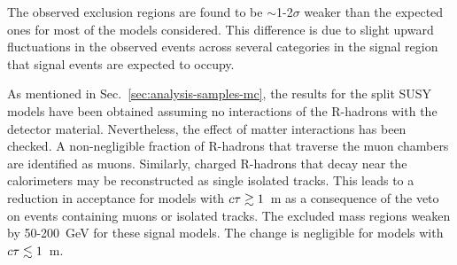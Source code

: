 The observed exclusion regions are found to be $\sim$1-2$\sigma$ weaker than 
the expected ones for most of the models considered. This difference is due to 
slight upward fluctuations in the observed events across several categories in 
the signal region that signal events are expected to occupy.

As mentioned in Sec.~\ref{sec:analysis-samples-mc}, the results for the split 
SUSY models have been obtained assuming no interactions of the R-hadrons with 
the detector material. Nevertheless, the effect of matter interactions has been 
checked. A 
non-negligible fraction of R-hadrons that traverse the muon chambers 
are identified as muons. Similarly, charged R-hadrons that decay near the 
calorimeters may be reconstructed as single isolated tracks. This leads to a 
reduction in acceptance for models with $c\tau \gtrsim 1$~m as a consequence of 
the veto on events containing muons or isolated tracks.
The excluded mass regions weaken by 50-200~GeV for these signal models. The 
change is negligible for models with $c\tau \lesssim 1$~m.

